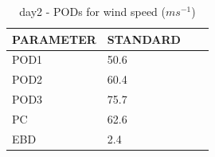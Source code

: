 \begin{table}[h!]
\begin{center}
\begin{tabular}{|l|l|l|l|}
\hline
\multicolumn{1}{|c|}{\cellcolor[HTML]{C0C0C0}\textbf{PARAMETER}} & \multicolumn{1}{c|}{\cellcolor[HTML]{C0C0C0}\textbf{STANDARD}} \\
\hline
\cellcolor[HTML]{C0C0C0}POD1  & 50.6                                \\
\cellcolor[HTML]{C0C0C0}POD2  & 60.4                                \\
\cellcolor[HTML]{C0C0C0}POD3  & 75.7                                \\
\cellcolor[HTML]{C0C0C0}PC    & 62.6                                  \\
\cellcolor[HTML]{C0C0C0}EBD   & 2.4                                 \\
\hline
\end{tabular}
\caption{day2 - PODs for wind speed ($m s^{-1}$)}
\label{tab:podws:day2}
\end{center}
\end{table}
